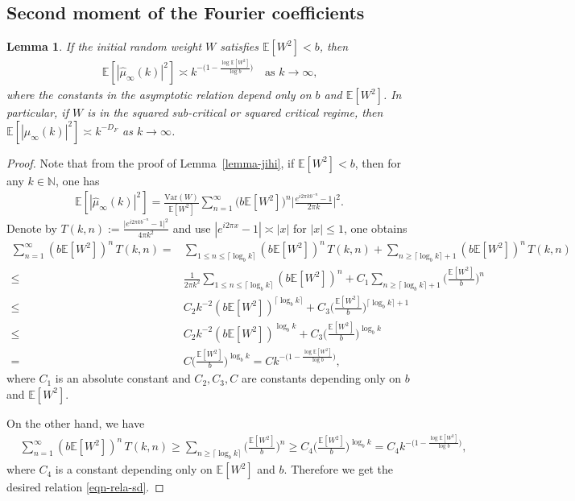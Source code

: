 \documentclass[12pt]{amsart}
\newtheorem{lemma}[theorem]{Lemma}
\theoremstyle{definition}
\theoremstyle{remark}
\newcommand{\N}{\mathbb{N}}
\newcommand{\E}{\mathbb{E}}
\numberwithin{equation}{section}
\begin{document}
\subsection{Second moment of the Fourier coefficients } \label{S-second moment}


\begin{lemma}
If the initial random weight $W$ satisfies $\E[W^2]<b$, then 
\begin{align}\label{eqn-rela-sd}
\E[|\widehat{\mu}_\infty(k)|^2]\asymp k^{-\big(1-\frac{\log \E[W^2]}{\log b}\big)} \quad \text{as $k\to\infty$,}
\end{align}
where the constants in the asymptotic relation depend only on $b$ and $\E[W^2]$.
In particular, if $W$ is in the squared sub-critical or squared critical regime, then  $\E[|\widehat{\mu}_\infty(k)|^2]\asymp k^{-D_F}$ as $k\to\infty$.
\end{lemma}
\begin{proof}
Note that  from the proof of  Lemma~\ref{lemma-jihi}, if $\E[W^2]<b$, then 
for any $k \in\N$, one has
\begin{align}\label{eqn-esdt}
\E[|\widehat{\mu}_\infty(k)|^2]=\frac{\mathrm{Var}(W)}{\E[W^2]}\sum_{n=1}^\infty \big(b\E[W^2]\big)^{n}\Big|\frac{e^{i2\pi k b^{-n}}-1}{2\pi k}\Big|^2.
\end{align}
Denote by  $T(k,n):=\frac{\big|e^{i2\pi  k b^{-n}}-1\big|^2}{4\pi k^2}$ and use $|e^{i2\pi x}-1|\asymp |x|$ for $|x|\leq 1$,
one obtains   
\begin{align*}
\sum_{n=1}^\infty(b\E[W^2])^n\,T(k,n)
=& \sum_{1\leq n\leq \lceil \log_b k \rceil}(b\E[W^2])^n\,T(k,n)+\sum_{n\geq \lceil \log_b k \rceil +1} (b\E[W^2])^n\,T(k,n)\\
\leq &\frac{1}{2\pi k ^2}\sum_{1\leq n\leq \lceil \log_b k \rceil}(b\E[W^2])^n+C_1 \sum_{n\geq \lceil \log_b k \rceil +1} \big(\frac{\E[W^2]}{b}\big)^n\\
\leq& C_2 k^{-2}(b\E[W^2])^{\lceil \log_b k \rceil}+C_3 \big(\frac{\E[W^2]}{b}\big)^{\lceil \log_b k \rceil +1}\\
\leq&  C_2 k ^{-2}(b\E[W^2])^{\log_b k }+C_3 \big(\frac{\E[W^2]}{b}\big)^{\log_b k }\\
=&  C \big(\frac{\E[W^2]}{b}\big)^{\log_b k } = C k^{-\big(1-\frac{\log \E[W^2]}{\log b}\big)},
\end{align*}
where   $C_1$ is an  absolute constant and $C_2,C_3, C$ are constants depending only on $b$ and $\E[W^2]$.  

On the other hand, we have
\begin{align*}
&\sum_{n=1}^\infty(b\E[W^2])^n\,T(k,n)
\geq  \sum_{n\geq \lceil \log_b k \rceil } \big(\frac{\E[W^2]}{b}\big)^n\geq C_4 \big(\frac{\E[W^2]}{b}\big)^{\log_b k }=C_4 k^{-\big(1-\frac{\log \E[W^2]}{\log b}\big)},
\end{align*}
where $C_4$ is a constant depending only on $\E[W^2]$ and $b$. Therefore we get the desired relation \eqref{eqn-rela-sd}. 
\end{proof}
\end{document}
